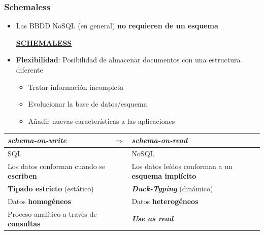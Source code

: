 \documentclass[14pt]{beamer}
\begin{document}
\begin{frame}
  \frametitle{Schemaless}
\begin{itemize}
\item Las BBDD NoSQL (en general) {\bf no requieren de un esquema}
\begin{alertblock}{}
  \centering
  \href{https://farm6.staticflickr.com/5483/29931060254_109e3e36da_o_d.jpg}{\bf
    SCHEMALESS}
\end{alertblock}
\item {\bf Flexibilidad}: Posibilidad de almacenar documentos con una
  estructura diferente
\begin{itemize}
\item Tratar información incompleta
\item Evolucionar la base de datos/esquema
\item Añadir nuevas características a las aplicaciones
\end{itemize}
\end{itemize}

\framebreak

\begin{small}
\begin{tabular}{p{}cp{}}
{\bfseries\itshape schema-on-write}&$\Rightarrow$&{\bfseries\itshape
                                                   schema-on-read}\\
\midrule
\rowcolor{blue!20} SQL&&NoSQL\\
\rowcolor{blue!15} Los datos conforman cuando se {\bf escriben}&&Los datos leídos conforman a
                                               un {\bf esquema implícito}\\
\rowcolor{blue!20} {\bf Tipado estricto} (estático) && {\bfseries\itshape Duck-Typing}
                                    (dinámico) \\
\rowcolor{blue!15}  Datos {\bf homogéneos} && Datos {\bf heterogéneos}\\
\rowcolor{blue!20} Proceso analítico a través de {\bf consultas} && {\bfseries\itshape Use as read}\\
\end{tabular}
\end{small}


\end{frame}
\end{document}

